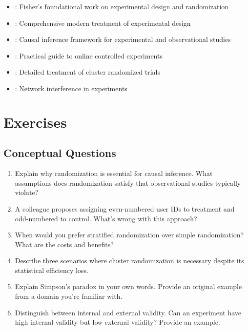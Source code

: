 \begin{itemize}
    \item \citet{fisher1935design}: Fisher's foundational work on experimental design and randomization
    \item \citet{box2005statistics}: Comprehensive modern treatment of experimental design
    \item \citet{imbens2015causal}: Causal inference framework for experimental and observational studies
    \item \citet{kohavi2020trustworthy}: Practical guide to online controlled experiments
    \item \citet{hayes2017cluster}: Detailed treatment of cluster randomized trials
    \item \citet{eckles2016design}: Network interference in experiments
\end{itemize}

\section{Exercises}

\subsection{Conceptual Questions}

\begin{enumerate}
    \item Explain why randomization is essential for causal inference. What assumptions does randomization satisfy that observational studies typically violate?

    \item A colleague proposes assigning even-numbered user IDs to treatment and odd-numbered to control. What's wrong with this approach?

    \item When would you prefer stratified randomization over simple randomization? What are the costs and benefits?

    \item Describe three scenarios where cluster randomization is necessary despite its statistical efficiency loss.

    \item Explain Simpson's paradox in your own words. Provide an original example from a domain you're familiar with.

    \item Distinguish between internal and external validity. Can an experiment have high internal validity but low external validity? Provide an example.
\end{enumerate}

